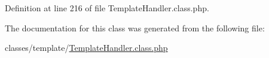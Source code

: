 Definition at line 216 of file Template\+Handler.\+class.\+php.



The documentation for this class was generated from the following file\+:\begin{DoxyCompactItemize}
\item 
classes/template/\hyperlink{TemplateHandler_8class_8php}{Template\+Handler.\+class.\+php}\end{DoxyCompactItemize}
